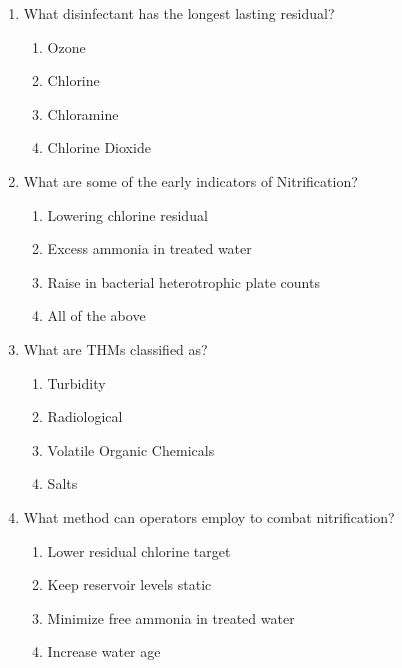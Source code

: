 \documentclass{article}
\begin{document}
\begin{enumerate}
\item  What disinfectant has the longest lasting residual?\\
\begin{enumerate}
\item Ozone\\
\item Chlorine\\
\item Chloramine\\
\item Chlorine Dioxide
\end{enumerate}

\item  What are some of the early indicators of Nitrification?\\
\begin{enumerate}
\item Lowering chlorine residual\\
\item Excess ammonia in treated water\\
\item Raise in bacterial heterotrophic plate counts\\
\item All of the above
\end{enumerate}

\item  What are THMs classified as?\\
\begin{enumerate}
\item Turbidity\\
\item Radiological\\
\item Volatile Organic Chemicals\\
\item Salts
\end{enumerate}

\item  What method can operators employ to combat nitrification?\\
\begin{enumerate}
\item Lower residual chlorine target\\
\item Keep reservoir levels static\\
\item Minimize free ammonia in treated water\\
\item Increase water age
\end{enumerate}


\end{enumerate}
\end{document}
